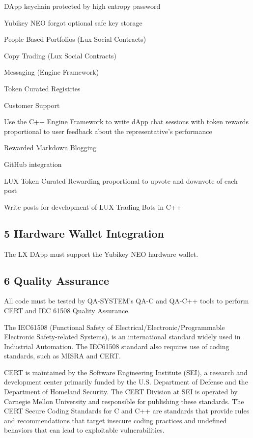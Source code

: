 \documentclass[11pt]{article}
\begin{document}
DApp keychain protected by high entropy password


Yubikey NEO forgot optional safe key storage


People Based Portfolios (Lux  Social Contracts)


Copy Trading (Lux  Social Contracts)


Messaging (Engine Framework)


Token Curated Registries


Customer Support


Use the C++ Engine Framework to write dApp chat sessions with token rewards proportional to user feedback about the representative's performance


Rewarded Markdown Blogging


GitHub integration


LUX Token Curated Rewarding proportional to upvote and downvote of each post


Write posts for development of LUX Trading Bots in C++


\subsection{5 Hardware Wallet Integration}

The LX DApp must support the Yubikey NEO hardware wallet.


\subsection{6 Quality Assurance}

All code must be tested by QA-SYSTEM's QA-C and QA-C++ tools to perform CERT and IEC 61508 Quality Assurance.


The IEC61508 (Functional Safety of Electrical/Electronic/Programmable Electronic Safety-related Systems), is an international standard widely used in Industrial Automation. The IEC61508 standard also requires use of coding standards, such as MISRA and CERT.


CERT is maintained by the Software Engineering Institute (SEI), a research and development center primarily funded by the U.S. Department of Defense and the Department of Homeland Security. The CERT Division at SEI is operated by Carnegie Mellon University and responsible for publishing these standards. The CERT\textregistered{} Secure Coding Standards for C and C++ are standards that provide rules and recommendations that target insecure coding practices and undefined behaviors that can lead to exploitable vulnerabilities.
\end{document}
